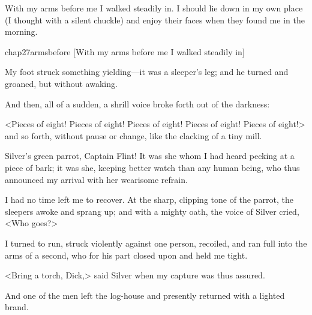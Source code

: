 With my arms before me I walked steadily in. I should lie down in my own place (I thought with a silent chuckle) and enjoy their faces when they found me in the morning.

\begin{bwbigpic}
	[\basicscale]
	{chap27armsbefore}
	[With my arms before me I walked steadily in]
\end{bwbigpic}

My foot struck something yielding—it was a sleeper's leg; and he turned and groaned, but without awaking.

And then, all of a sudden, a shrill voice broke forth out of the darkness:

<Pieces of eight! Pieces of eight! Pieces of eight! Pieces of eight! Pieces of eight!> and so forth, without pause or change, like the clacking of a tiny mill.

Silver's green parrot, Captain Flint! It was she whom I had heard pecking at a piece of bark; it was she, keeping better watch than any human being, who thus announced my arrival with her wearisome refrain.

I had no time left me to recover. At the sharp, clipping tone of the parrot, the sleepers awoke and sprang up; and with a mighty oath, the voice of Silver cried, <Who goes?>

I turned to run, struck violently against one person, recoiled, and ran full into the arms of a second, who for his part closed upon and held me tight.

<Bring a torch, Dick,> said Silver when my capture was thus assured.

And one of the men left the log-house and presently returned with a lighted brand.